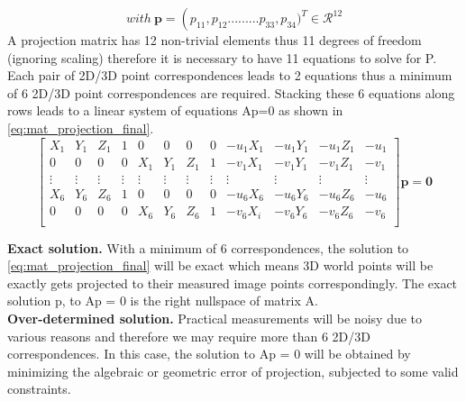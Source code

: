 \begin{equation*}
with\ \textbf{p} = \left (p_{11}, p_{12}.........p_{33},p_{34})^T  \in \mathcal{R}^{12} \right. 
\end{equation*}
A projection matrix has 12 non-trivial elements thus 11 degrees of freedom (ignoring scaling) therefore it is necessary to have 11 equations to solve for P. Each pair of 2D/3D point correspondences leads to 2 equations thus a minimum of 6 2D/3D point correspondences are required. Stacking these 6 equations along rows leads to a linear system of equations Ap=0 as shown in \cref{eq:mat_projection_final}. 
\begin{equation}
\begin{bmatrix}
\textbf{$X_1$} & \textbf{$Y_1$} & \textbf{$Z_1$} & 1 & 0 & 0 & 0 & 0 & \textbf{$-u_1 X_1$} & \textbf{$-u_1Y_1$} & \textbf{$-u_1 Z_1$} & -u_1\\
0 & 0 & 0 & 0 & \textbf{$X_1$} & \textbf{$Y_1$}  & \textbf{$Z_1$} & 1 & \textbf{$-v_1X_1$} & \textbf{$-v_1Y_1$} & \textbf{$-v_1Z_1$} & -v_1\\
\vdots & \vdots  & \vdots  & \vdots  & \vdots  & \vdots  & \vdots  & \vdots  & \vdots  & \vdots  & \vdots  & \vdots\\
\textbf{$X_6$} & \textbf{$Y_6$} & \textbf{$Z_6$} & 1 & 0 & 0 & 0 & 0 & \textbf{$-u_6 X_6$} & \textbf{$-u_6Y_6$} & \textbf{$-u_6 Z_6$} & -u_6\\
0 & 0 & 0 & 0 & \textbf{$X_6$} & \textbf{$Y_6$}  & \textbf{$Z_6$} & 1 & \textbf{$-v_6X_i$} & \textbf{$-v_6Y_6$} & \textbf{$-v_6Z_6$} & -v_6\\
\end{bmatrix}
\textbf{p} = \textbf{0}
\label{eq:mat_projection_final}
\end{equation} 

\textbf{Exact solution.} With a minimum of 6 correspondences, the solution to \ref{eq:mat_projection_final} will be exact which means 3D world points will be exactly gets projected to their measured image points correspondingly. The exact solution p, to Ap = 0 is the right nullspace of matrix A.\\

\textbf{Over-determined solution.} Practical measurements will be noisy due to various reasons and therefore we may require more than 6 2D/3D correspondences. In this case, the solution to Ap = 0 will be obtained by minimizing the algebraic or geometric error of projection, subjected to some valid constraints.\\ 

